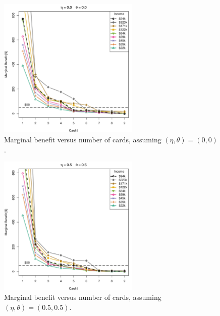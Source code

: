 \begin{figure}[tbh]
    \begin{center}
    \includegraphics[width=0.6\textwidth]{../Figures/MBvsKvsIncome_0_0.pdf}
    \caption{Marginal benefit versus number of cards, assuming $(\eta, \theta) = (0,0)$.}
    \label{fig:MBvsKvsIncome_0_0}
    \end{center}
\end{figure}

\begin{figure}[tbh]
    \begin{center}
    \includegraphics[width=0.6\textwidth]{../Figures/MBvsKvsIncome_05_05.pdf}
    \caption{Marginal benefit versus number of cards, assuming $(\eta, \theta) = (0.5,0.5)$.}
    \label{fig:MBvsKvsIncome_05_05}
    \end{center}
\end{figure}

